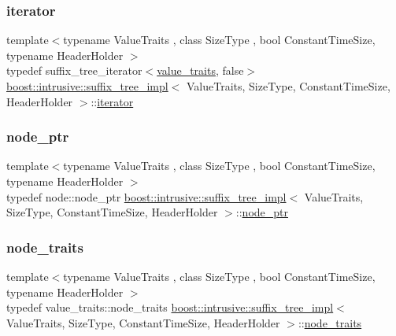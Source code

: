 \subsubsection{\texorpdfstring{iterator}{iterator}}
{\footnotesize\ttfamily template$<$typename Value\+Traits , class Size\+Type , bool Constant\+Time\+Size, typename Header\+Holder $>$ \\
typedef suffix\+\_\+tree\+\_\+iterator$<$\hyperlink{classboost_1_1intrusive_1_1suffix__tree__impl_a30d9e164c38c11cd38917ad14e9f3e88}{value\+\_\+traits}, false$>$ \hyperlink{classboost_1_1intrusive_1_1suffix__tree__impl}{boost\+::intrusive\+::suffix\+\_\+tree\+\_\+impl}$<$ Value\+Traits, Size\+Type, Constant\+Time\+Size, Header\+Holder $>$\+::\hyperlink{classboost_1_1intrusive_1_1suffix__tree__impl_a2df3b52dced59346b59db470e93ba87c}{iterator}}

\mbox{\label{classboost_1_1intrusive_1_1suffix__tree__impl_a055e19a35a8268047cec3a6e9341dfca}} 
\subsubsection{\texorpdfstring{node\+\_\+ptr}{node\_ptr}}
{\footnotesize\ttfamily template$<$typename Value\+Traits , class Size\+Type , bool Constant\+Time\+Size, typename Header\+Holder $>$ \\
typedef node\+::node\+\_\+ptr \hyperlink{classboost_1_1intrusive_1_1suffix__tree__impl}{boost\+::intrusive\+::suffix\+\_\+tree\+\_\+impl}$<$ Value\+Traits, Size\+Type, Constant\+Time\+Size, Header\+Holder $>$\+::\hyperlink{classboost_1_1intrusive_1_1suffix__tree__impl_a055e19a35a8268047cec3a6e9341dfca}{node\+\_\+ptr}}

\mbox{\label{classboost_1_1intrusive_1_1suffix__tree__impl_a4fac695b2c8ea16789711a9840af44c4}} 
\subsubsection{\texorpdfstring{node\+\_\+traits}{node\_traits}}
{\footnotesize\ttfamily template$<$typename Value\+Traits , class Size\+Type , bool Constant\+Time\+Size, typename Header\+Holder $>$ \\
typedef value\+\_\+traits\+::node\+\_\+traits \hyperlink{classboost_1_1intrusive_1_1suffix__tree__impl}{boost\+::intrusive\+::suffix\+\_\+tree\+\_\+impl}$<$ Value\+Traits, Size\+Type, Constant\+Time\+Size, Header\+Holder $>$\+::\hyperlink{classboost_1_1intrusive_1_1suffix__tree__impl_a4fac695b2c8ea16789711a9840af44c4}{node\+\_\+traits}}

